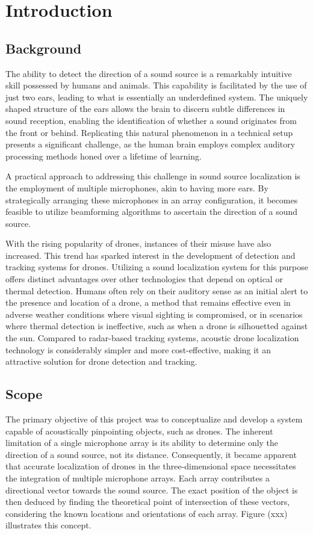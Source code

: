 \chapter{Introduction}
\section{Background}
The ability to detect the direction of a sound source is a remarkably intuitive skill possessed by humans and animals.
This capability is facilitated by the use of just two ears, leading to what is essentially an underdefined system.
The uniquely shaped structure of the ears allows the brain to discern subtle differences in sound reception,
enabling the identification of whether a sound originates from the front or behind.
Replicating this natural phenomenon in a technical setup presents a significant challenge,
as the human brain employs complex auditory processing methods honed over a lifetime of learning.

A practical approach to addressing this challenge in sound source localization is the employment of multiple microphones, akin to having more ears.
By strategically arranging these microphones in an array configuration, it becomes feasible to utilize beamforming algorithms to ascertain the direction of a sound source.

With the rising popularity of drones, instances of their misuse have also increased.
This trend has sparked interest in the development of detection and tracking systems for drones.
Utilizing a sound localization system for this purpose offers distinct advantages over other technologies that depend on optical or thermal detection.
Humans often rely on their auditory sense as an initial alert to the presence and location of a drone,
a method that remains effective even in adverse weather conditions where visual sighting is compromised,
or in scenarios where thermal detection is ineffective, such as when a drone is silhouetted against the sun.
Compared to radar-based tracking systems, acoustic drone localization technology is considerably simpler and more cost-effective,
making it an attractive solution for drone detection and tracking.

\newpage
\section{Scope}
The primary objective of this project was to conceptualize and develop a system capable of acoustically pinpointing objects, such as drones.
The inherent limitation of a single microphone array is its ability to determine only the direction of a sound source, not its distance.
Consequently, it became apparent that accurate localization of drones in the three-dimensional space necessitates the integration of multiple microphone arrays.
Each array contributes a directional vector towards the sound source.
The exact position of the object is then deduced by finding the theoretical point of intersection of these vectors, considering the known locations and orientations of each array.
Figure (xxx) illustrates this concept.

